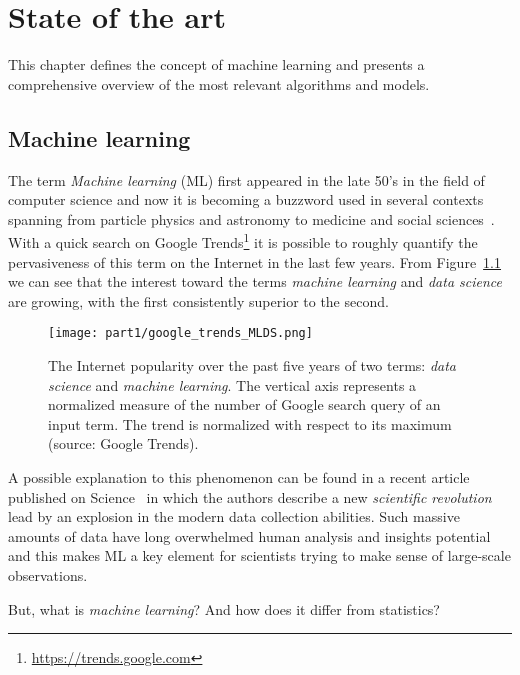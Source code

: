 
\chapter{State of the art} \label{chap:state-of-the-art}

This chapter defines the concept of machine learning and presents a comprehensive overview of the most relevant algorithms and models.

\section{Machine learning} \label{sec:machine_learning}


The term \textit{Machine learning} (ML) first appeared in the late 50's in the field of computer science and now it is becoming a buzzword used in several contexts spanning from particle physics and astronomy to medicine and social sciences~\cite{service2017ai}.
With a quick search on Google Trends\footnote{\url{https://trends.google.com}} it is possible to roughly quantify the pervasiveness of this term on the Internet in the last few years. From Figure~\ref{fig:google_trend_ML} we can see that the interest toward the terms \textit{machine learning} and \textit{data science} are growing, with the first consistently superior to the second.

\begin{figure}[h!]
  \centering
    \texttt{[image: part1/google\_trends\_MLDS.png]}
  \caption{The Internet popularity over the past five years of two terms: \textit{data science} and \textit{machine learning}. The vertical axis represents a normalized measure of the number of Google search query of an input term. The trend is normalized with respect to its maximum (source: Google Trends).} \label{fig:google_trend_ML}
\end{figure}

A possible explanation to this phenomenon can be found in a recent article published on Science~\cite{appenzeller2017revolution} in which the authors describe a new \textit{scientific revolution} lead by an explosion in the modern data collection abilities.
Such massive amounts of data have long overwhelmed human analysis and insights potential and this makes ML a key element for scientists trying to make sense of large-scale observations.

But, what is \textit{machine learning}? And how does it differ from statistics?

